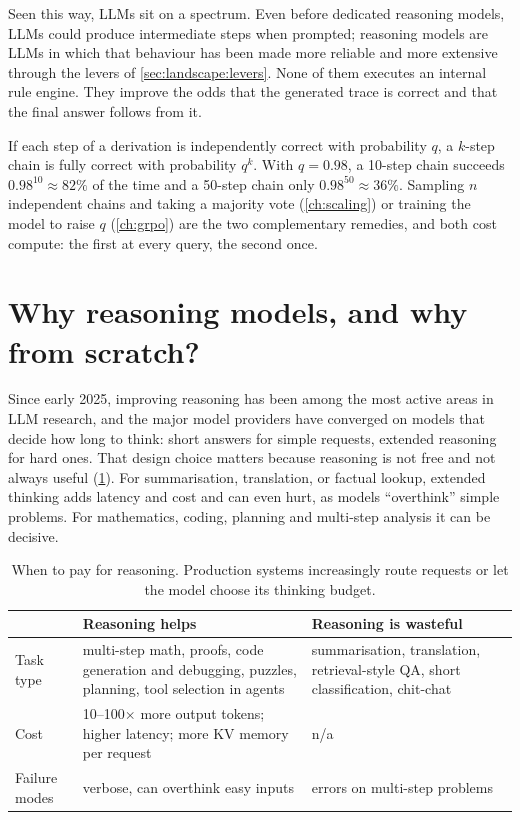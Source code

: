 Seen this way, LLMs sit on a spectrum. Even before dedicated reasoning models, LLMs could produce
intermediate steps when prompted; reasoning models are LLMs in which that behaviour has been made more
reliable and more extensive through the levers of \cref{sec:landscape:levers}. None of them executes
an internal rule engine. They improve the odds that the generated trace is correct and that the final
answer follows from it.

\begin{napkinmath}
If each step of a derivation is independently correct with probability $q$, a $k$-step chain is
fully correct with probability $q^k$. With $q=0.98$, a 10-step chain succeeds $0.98^{10}\approx 82\%$ of the
time and a 50-step chain only $0.98^{50}\approx 36\%$. Sampling $n$ independent chains and taking a
majority vote (\cref{ch:scaling}) or training the model to raise $q$ (\cref{ch:grpo}) are the two
complementary remedies, and both cost compute: the first at every query, the second once.
\end{napkinmath}

\section{Why reasoning models, and why from scratch?}\label{sec:landscape:why}

Since early 2025, improving reasoning has been among the most active areas in LLM research, and the
major model providers have converged on models that decide how long to think: short answers for simple
requests, extended reasoning for hard ones. That design choice matters because reasoning is not free and
not always useful (\cref{tab:landscape:whenreason}). For summarisation, translation, or factual lookup,
extended thinking adds latency and cost and can even hurt, as models ``overthink'' simple problems.
For mathematics, coding, planning and multi-step analysis it can be decisive.

\begin{table}[t]
\centering\small
\begin{tabularx}{\linewidth}{lXX}
\toprule
 & \textbf{Reasoning helps} & \textbf{Reasoning is wasteful}\\
\midrule
Task type & multi-step math, proofs, code generation and debugging, puzzles, planning, tool selection in agents
 & summarisation, translation, retrieval-style QA, short classification, chit-chat\\
Cost & 10--100$\times$ more output tokens; higher latency; more KV memory per request
 & n/a\\
Failure modes & verbose, can overthink easy inputs & errors on multi-step problems \\
\bottomrule
\end{tabularx}
\caption{When to pay for reasoning. Production systems increasingly route requests or let the model
choose its thinking budget.}
\label{tab:landscape:whenreason}
\end{table}

